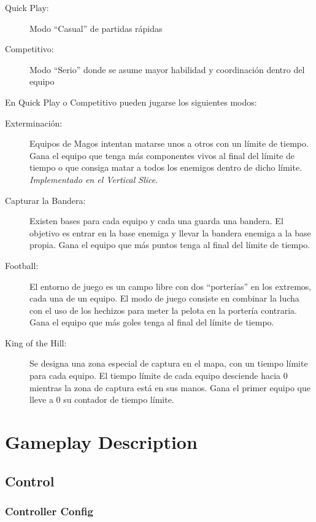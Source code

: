 \documentclass[12pt]{report}
\begin{document}
\begin{description}
\item[Quick Play:] Modo ``Casual'' de partidas rápidas
\item[Competitivo:] Modo ``Serio'' donde se asume mayor habilidad y coordinación dentro del equipo
\end{description}

\newpage

En Quick Play o Competitivo pueden jugarse los siguientes modos:

\begin{description}
\item[Exterminación:] Equipos de Magos intentan matarse unos a otros con un límite de tiempo. Gana el equipo que tenga más componentes vivos al final del límite de tiempo o que consiga matar a todos los enemigos dentro de dicho límite. \textit{Implementado en el Vertical Slice}.
\item[Capturar la Bandera:] Existen bases para cada equipo y cada una guarda una bandera. El objetivo es entrar en la base enemiga y llevar la bandera enemiga a la base propia. Gana el equipo que más puntos tenga al final del límite de tiempo.
\item[Football:] El entorno de juego es un campo libre con dos ``porterías'' en los extremos, cada una de un equipo. El modo de juego consiste en combinar la lucha con el uso de los hechizos para meter la pelota en la portería contraria. Gana el equipo que más goles tenga al final del límite de tiempo.
\item[King of the Hill:] Se designa una zona especial de captura en el mapa, con un tiempo límite para cada equipo. El tiempo límite de cada equipo desciende hacia 0 mientras la zona de captura está en sus manos. Gana el primer equipo que lleve a 0 su contador de tiempo límite.
\end{description}

\newpage 

\chapter{Gameplay Description}

\section{Control}

\subsection{Controller Config}
\end{document}
